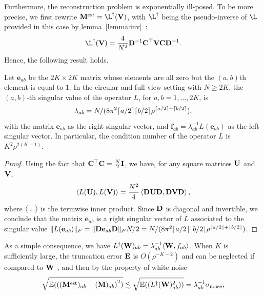 Furthermore, the reconstruction problem is exponentially
ill-posed. To be more precise, we first rewrite $\bMest=\L^\dagger(\bV)$, with
$\L^\dagger$ being the pseudo-inverse of $\L$ provided in this case by lemma~\ref{lemma:inv}~:
\begin{equation}
\L^\dagger(\bV)=\frac{4}{N^2}\inv\bD\bC^\top \bV \bC \inv\bD.
\label{eq:pseudo_L_full_aov}
\end{equation}
Hence, the following result holds.
\begin{proposition}\label{proposition:full-angle-view-svd}
Let $\mathbf{e}_{ab}$ be the $2K\times2K$ matrix whose elements
are all zero but the $(a,b)$th element is equal to $1$.
  In the circular and full-view setting with $N\geq2K$, the $(a,b)$-th singular value of the
  operator $L$, for $a,b=1, \ldots, 2K$,  is
\begin{equation} \label{singv}
  \lambda_{ab}=N/(8\pi^2 \lceil a/2 \rceil\lceil b/2 \rceil\rho^{\lceil a/2 \rceil+\lceil b/2 \rceil}),
  \end{equation} with
  the matrix $\mathbf{e}_{ab}$ as the right singular vector, and
$\mathbf{f}_{ab}=\lambda_{ab}^{-1}L(\mathbf{e}_{ab})$
  as the left singular vector. In particular, the condition number of the operator $L$
  is
  $K^2\rho^{2(K-1)}$. %
\end{proposition}
\begin{proof}
  Using the fact that $\mathbf{C}^\top \mathbf{C}=\frac N 2\mathbf{I}$, we have, for any square matrices $\mathbf{U}$ and
  $\mathbf{V}$,
  \begin{align}
    \label{eq:L_innerprod}
    \left\langle L(\mathbf{U}),L(\mathbf{V}) \right\rangle = \frac{N^2}{4}\left\langle \mathbf{D} \mathbf{U} \mathbf{D}, \mathbf{D} \mathbf{V} \mathbf{D} \right\rangle,
  \end{align}
  where $\langle \cdot,\cdot \rangle$ is the termwise inner product. Since $\mathbf{D}$ is diagonal and invertible,
  we conclude that the matrix $\mathbf{e}_{ab}$ is a right singular vector of
  $L$ associated to the singular value $\mathopen\| L(\mathbf{e}_{ab}) \mathclose\|_F = \mathopen\| \mathbf{D}
\mathbf{e}_{ab} \mathbf{D} \mathclose\|_F N/2 = N/(8\pi^2
  \lceil a/2 \rceil\lceil b/2 \rceil\rho^{\lceil a/2 \rceil+\lceil b/2 \rceil})$.
\end{proof}
As a simple consequence, we have $L^\dagger(\mathbf{W})_{ab} =
\lambda_{ab}^{-1}\langle \mathbf{W},f_{ab} \rangle$. When $K$ is sufficiently
large, the truncation error $\mathbf{E}$ is $O(\rho^{-K-2})$ and can be
neglected if compared to $\mathbf{W}$ \cite{ABGJKW2012dico}, and then
by the property of white noise
\begin{align*}
  \sqrt{\mathbb{E}(\left( (\mathbf{M}^{\text{est}})_{ab} - (\mathbf{M})_{ab} \right)^2)} \lesssim
  \sqrt{\mathbb{E}(\left( L^\dagger(\mathbf{W})_{ab}^2 \right))}
  = \lambda_{ab}^{-1}\sigma_{\text{noise}} ,
\end{align*}
